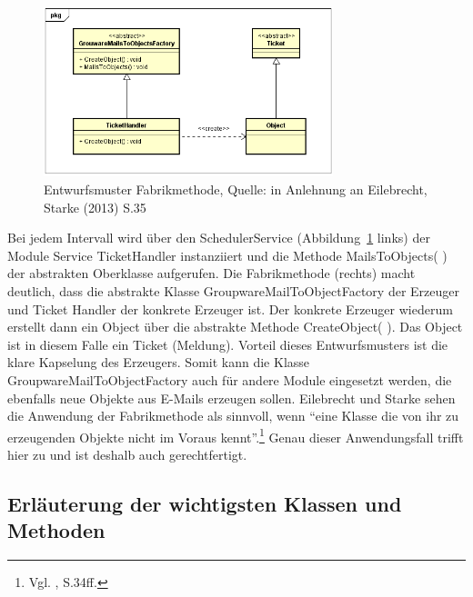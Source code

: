 \begin{figure}[h!]
\centering
\includegraphics[width=0.75\textwidth]{Abbildungen/Entwurfsmuster.png}
	\caption[Entwurfsmuster Fabrikmethode]{Entwurfsmuster Fabrikmethode, Quelle: in Anlehnung an Eilebrecht, Starke (2013) S.35}
	\label{fig:Entwurfsmuster}
\end{figure}

\noindent
Bei jedem Intervall wird über den SchedulerService (Abbildung~\ref{fig:Entwurfsmuster} links) der Module Service TicketHandler instanziiert und die Methode MailsToObjects( ) der abstrakten Oberklasse aufgerufen. Die Fabrikmethode (rechts) macht deutlich, dass die abstrakte Klasse GroupwareMailToObjectFactory der Erzeuger und Ticket Handler der konkrete Erzeuger ist. Der konkrete Erzeuger wiederum erstellt dann ein Object über die abstrakte Methode CreateObject( ). Das Object ist in diesem Falle ein Ticket (Meldung). Vorteil dieses Entwurfsmusters ist die klare Kapselung des Erzeugers. Somit kann die Klasse GroupwareMailToObjectFactory auch für andere Module eingesetzt werden, die ebenfalls neue Objekte aus E-Mails erzeugen sollen. Eilebrecht und Starke sehen die Anwendung der Fabrikmethode als sinnvoll, wenn \enquote{eine Klasse die von ihr zu erzeugenden Objekte nicht im Voraus kennt}.\footnote{Vgl. \citeauthor{PatternsKompakt} \citeyear{PatternsKompakt}, S.34ff.} Genau dieser Anwendungsfall trifft hier zu und ist deshalb auch gerechtfertigt.\\






\subsection{Erläuterung der wichtigsten Klassen und Methoden}



